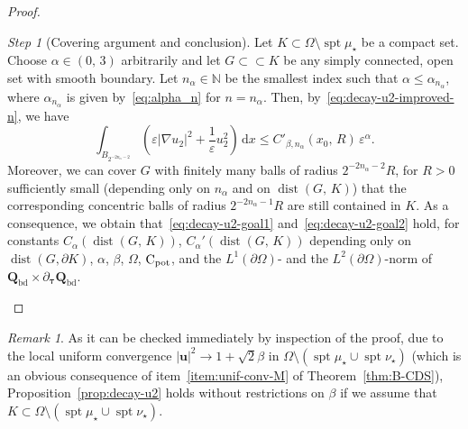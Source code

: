 \documentclass[a4paper, 11pt, twoside, leqno]{article}
\theoremstyle{definition}              %
\theoremstyle{remark}                  %
\newtheorem{step}{Step}
\newtheorem{remark}{Remark}
\DeclareMathOperator{\dist}{dist}                                   %
\DeclareMathOperator{\spt}{spt}                                     %
\newcommand{\abs}[1]{\left| #1 \right|}                             %
\newcommand{\csubset}{\subset\!\subset}                             %
\renewcommand{\d}{\mathrm{d}}
\newcommand{\Q}{\mathbf{Q}}
\renewcommand{\u}{\mathbf{u}}
\newcommand{\eps}{\varepsilon}
\newcommand{\Cpot}{{\rm C}_{\rm pot}}
\newcommand{\ttau}{{\boldsymbol{\tau}}}
\newcommand{\Qb}{\Q_{\mathrm{bd}}}
\begin{document}
\begin{proof}
\begin{step}[Covering argument and conclusion]
    Let $K \subset \Omega \setminus \spt\mu_\star$ be a compact set. 
    Choose $\alpha \in (0,\,3)$ arbitrarily and let $G \csubset K$ be any simply connected, open set with smooth boundary. 
    Let $n_\alpha \in \mathbb{N}$ be the smallest index such that $\alpha \leq \alpha_{n_\alpha}$, where $\alpha_{n_\alpha}$ is given by~\eqref{eq:alpha_n} for $n = n_\alpha$. 
    Then, by~\eqref{eq:decay-u2-improved-n}, we have 
    \[
            \int_{B_{2^{-2{n_\alpha}-2}}} \left( \eps \abs{\nabla u_2}^2 + \frac{1}{\eps} u_2^2 \right)\,{\d}x 
        \leq C'_{\beta,n_\alpha}(x_0,\,R) \, \eps^{\alpha}.
    \]
    Moreover, we can cover $G$ with finitely many balls of radius $2^{{-2 n_\alpha} -2}R$, for $R > 0$ sufficiently small (depending only on $n_\alpha$ and on $\dist(G,\,K)$) that the corresponding concentric balls of radius $2^{-2n_\alpha-1}R$ are still contained in $K$. As a consequence, we obtain that~\eqref{eq:decay-u2-goal1} and~\eqref{eq:decay-u2-goal2} hold, for constants $C_\alpha(\dist(G,\,K))$, $C_\alpha'(\dist(G,\,K))$ depending only on $\dist(G, \partial K)$, $\alpha$, $\beta$, $\Omega$, $\Cpot$, and the $L^1(\partial\Omega)$- and the $L^2(\partial \Omega)$-norm of $\Qb \times \partial_\ttau \Qb$.
\end{step}
\end{proof}

\begin{remark}\label{rk:decay-away-from-singular-sets}
	As it can be checked immediately by inspection of the proof, due to 
	the local uniform convergence $\abs{\u}^2 \to 1 + \sqrt{2}\beta$ 
	in $\Omega \setminus (\spt\mu_\star \cup \spt\nu_\star)$ (which is 
	an obvious consequence of item~\ref{item:unif-conv-M} of Theorem~\ref{thm:B-CDS}), 
	Proposition~\ref{prop:decay-u2} holds without restrictions 
	on $\beta$ if we assume that 
	$K \subset \Omega \setminus (\spt\mu_\star \cup \spt\nu_\star)$.
\end{remark}
\end{document}
